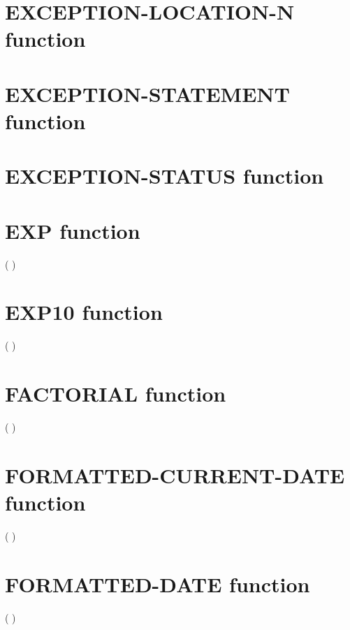  

\section{EXCEPTION-LOCATION-N function}


\section{EXCEPTION-STATEMENT function}

 

\section{EXCEPTION-STATUS function}

 

\section{EXP function}

  ( \argument )

\section{EXP10 function}

  ( \argument )

\section{FACTORIAL function}

  ( \argument )

\section{FORMATTED-CURRENT-DATE function}

  ( \argument )

\section{FORMATTED-DATE function}

  ( \argument \argument)

